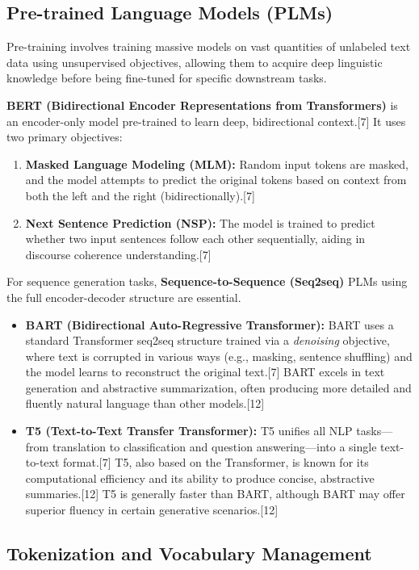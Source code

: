\documentclass{article}
\begin{document}
\subsection{Pre-trained Language Models (PLMs)}

Pre-training involves training massive models on vast quantities of unlabeled text data using unsupervised objectives, allowing them to acquire deep linguistic knowledge before being fine-tuned for specific downstream tasks.

\textbf{BERT (Bidirectional Encoder Representations from Transformers)} is an encoder-only model pre-trained to learn deep, bidirectional context.[7] It uses two primary objectives:
\begin{enumerate}
    \item \textbf{Masked Language Modeling (MLM):} Random input tokens are masked, and the model attempts to predict the original tokens based on context from both the left and the right (bidirectionally).[7]
    \item \textbf{Next Sentence Prediction (NSP):} The model is trained to predict whether two input sentences follow each other sequentially, aiding in discourse coherence understanding.[7]
\end{enumerate}

For sequence generation tasks, \textbf{Sequence-to-Sequence (Seq2seq)} PLMs using the full encoder-decoder structure are essential.
\begin{itemize}
    \item \textbf{BART (Bidirectional Auto-Regressive Transformer):} BART uses a standard Transformer seq2seq structure trained via a \textit{denoising} objective, where text is corrupted in various ways (e.g., masking, sentence shuffling) and the model learns to reconstruct the original text.[7] BART excels in text generation and abstractive summarization, often producing more detailed and fluently natural language than other models.[12]
    \item \textbf{T5 (Text-to-Text Transfer Transformer):} T5 unifies all NLP tasks—from translation to classification and question answering—into a single text-to-text format.[7] T5, also based on the Transformer, is known for its computational efficiency and its ability to produce concise, abstractive summaries.[12] T5 is generally faster than BART, although BART may offer superior fluency in certain generative scenarios.[12]
\end{itemize}

\subsection{Tokenization and Vocabulary Management}
\end{document}

